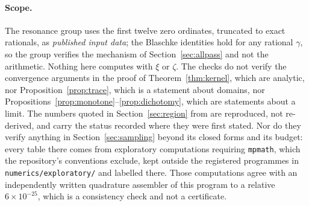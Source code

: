 \paragraph{Scope.} The resonance group uses the first twelve zero ordinates,
truncated to exact rationals, as \emph{published input data}; the Blaschke
identities hold for any rational $\gamma$, so the group verifies the mechanism of
Section~\ref{sec:allpass} and not the arithmetic. Nothing here computes with
$\xi$ or $\zeta$. The checks do not verify the convergence arguments in the proof
of Theorem~\ref{thm:kernel}, which are analytic, nor
Proposition~\ref{prop:trace}, which is a statement about domains, nor
Propositions~\ref{prop:monotone}--\ref{prop:dichotomy}, which are statements
about a limit. The numbers quoted in Section~\ref{sec:region} from
\cite{CriticalPath} are reproduced, not re-derived, and carry the status recorded
where they were first stated. Nor do they verify anything in
Section~\ref{sec:sampling} beyond its closed forms and its budget: every table
there comes from exploratory computations requiring \texttt{mpmath}, which the
repository's conventions exclude, kept outside the registered programmes in
\texttt{numerics/exploratory/} and labelled there. Those computations agree with
an independently written quadrature assembler of this program to a relative
$6\times10^{-25}$, which is a consistency check and not a certificate.
